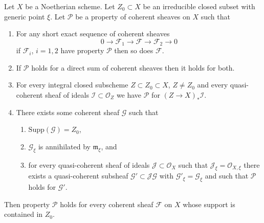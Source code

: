 \begin{lemma}
\label{lemma-property-irreducible-higher-rank-cohomological}
Let $X$ be a Noetherian scheme. Let $Z_0 \subset X$ be an irreducible
closed subset with generic point $\xi$. Let $\mathcal{P}$ be a property
of coherent sheaves on $X$ such that
\begin{enumerate}
\item For any short exact sequence of coherent sheaves
$$
0 \to \mathcal{F}_1 \to \mathcal{F} \to \mathcal{F}_2 \to 0
$$
if $\mathcal{F}_i$, $i = 1, 2$ have property $\mathcal{P}$
then so does $\mathcal{F}$.
\item If $\mathcal{P}$ holds for a direct sum of coherent sheaves
then it holds for both.
\item For every integral closed subscheme $Z \subset Z_0 \subset X$,
$Z \not = Z_0$ and every quasi-coherent sheaf of ideals
$\mathcal{I} \subset \mathcal{O}_Z$ we have
$\mathcal{P}$ for $(Z \to X)_*\mathcal{I}$.
\item There exists some coherent sheaf $\mathcal{G}$ such that
\begin{enumerate}
\item $\text{Supp}(\mathcal{G}) = Z_0$,
\item $\mathcal{G}_\xi$ is annihilated by $\mathfrak m_\xi$, and
\item for every quasi-coherent sheaf of ideals
$\mathcal{J} \subset \mathcal{O}_X$ such that
$\mathcal{J}_\xi = \mathcal{O}_{X, \xi}$ there exists a quasi-coherent
subsheaf $\mathcal{G}' \subset \mathcal{J}\mathcal{G}$ with
$\mathcal{G}'_\xi = \mathcal{G}_\xi$ and such that
$\mathcal{P}$ holds for $\mathcal{G}'$.
\end{enumerate}
\end{enumerate}
Then property $\mathcal{P}$ holds for every coherent sheaf
$\mathcal{F}$ on $X$ whose support is contained in $Z_0$.
\end{lemma}


